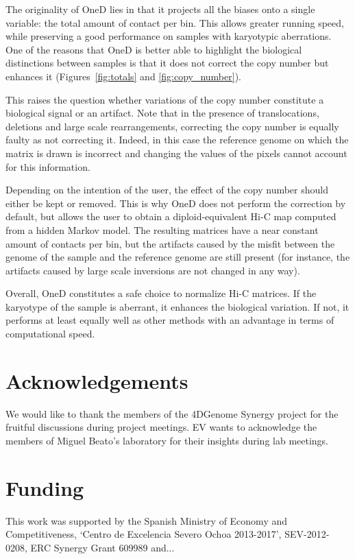 \documentclass{bioinfo}
\begin{document}
The originality of OneD lies in that it projects all the biases onto a
single variable: the total amount of contact per bin. This allows greater
running speed, while preserving a good performance on samples with
karyotypic aberrations. One of the reasons that OneD is better able to
highlight the biological distinctions between samples is that it does not
correct the copy number but enhances it (Figures~\ref{fig:totals} and
\ref{fig:copy_number}).

This raises the question whether variations of the copy number constitute
a biological signal or an artifact. Note that in the presence of
translocations, deletions and large scale rearrangements, correcting the
copy number is equally faulty as not correcting it. Indeed, in this case
the reference genome on which the matrix is drawn is incorrect and
changing the values of the pixels cannot account for this information.

Depending on the intention of the user, the effect of the copy number
should either be kept or removed. This is why OneD does not perform
the correction by default, but allows the user to obtain a
diploid-equivalent Hi-C map computed from a hidden Markov model. The
resulting matrices have a near constant amount of contacts per bin, but
the artifacts caused by the misfit between the genome of the sample and
the reference genome are still present (for instance, the artifacts caused
by large scale inversions are not changed in any way).

Overall, OneD constitutes a safe choice to normalize Hi-C matrices. If the
karyotype of the sample is aberrant, it enhances the biological variation.
If not, it performs at least equally well as other methods with an
advantage in terms of computational speed.



\section*{Acknowledgements}

We would like to thank the members of the 4DGenome Synergy project for the
fruitful discussions during project meetings. EV wants to acknowledge
the members of Miguel Beato's laboratory for their insights during lab
meetings.

\section*{Funding}

This work was supported by the Spanish Ministry of Economy and
Competitiveness, ‘Centro de Excelencia Severo Ochoa 2013-2017’,
SEV-2012-0208, ERC Synergy Grant 609989 and...

\vspace*{-12pt}



\end{document}
